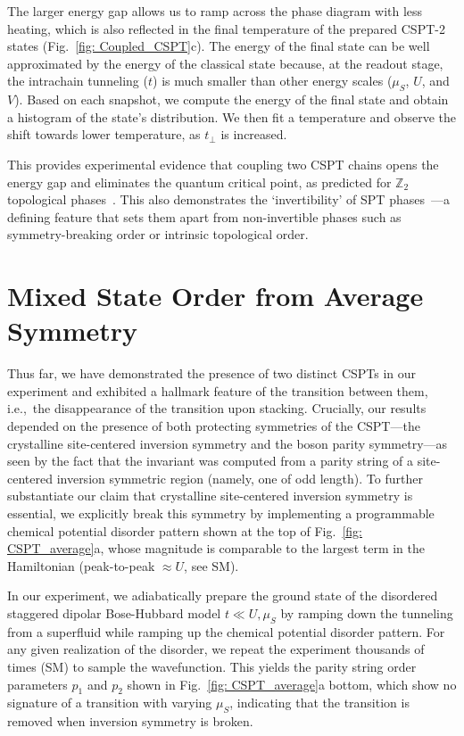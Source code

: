 \documentclass[preprint,superscriptaddress,floatfix, nofootinbib]{revtex4-2}
\begin{document}
The larger energy gap allows us to ramp across the phase diagram with less heating, which is also reflected in the final temperature of the prepared CSPT-2 states (Fig.~\ref{fig: Coupled_CSPT}c).
%
The energy of the final state can be well approximated by the energy of the classical state because, at the readout stage, the intrachain tunneling ($t$) is much smaller than other energy scales ($\mu_S$, $U$, and $V$). Based on each snapshot, we compute the energy of the final state and obtain a histogram of the state's distribution.
%
We then fit a temperature and observe the shift towards lower temperature, as $t_\perp$ is increased.

This provides experimental evidence that coupling two CSPT chains opens the energy gap and eliminates the quantum critical point, as predicted for $\mathbb{Z}_2$ topological phases~\cite{Gu2009}. This also demonstrates the `invertibility' of SPT phases~\cite{Freed2014}---a defining feature that sets them apart from non-invertible phases such as symmetry-breaking order or intrinsic topological order.

\section{Mixed State Order from Average Symmetry}

Thus far, we have demonstrated the presence of two distinct CSPTs in our experiment and exhibited a hallmark feature of the transition between them, i.e.,~the disappearance of the transition upon stacking.
%
Crucially, our results depended on the presence of both protecting symmetries of the CSPT---the crystalline site-centered inversion symmetry and the boson parity symmetry---as seen by the fact that the invariant was computed from a parity string of a site-centered inversion symmetric region (namely, one of odd length).
%
To further substantiate our claim that crystalline site-centered inversion symmetry is essential, we explicitly break this symmetry by implementing a programmable chemical potential disorder pattern shown at the top of Fig.~\ref{fig: CSPT_average}a, whose magnitude is comparable to the largest term in the Hamiltonian (peak-to-peak $\approx U$, see SM).

%
In our experiment, we adiabatically prepare the ground state of the disordered staggered dipolar Bose-Hubbard model $t \ll U, \mu_S$ by ramping down the tunneling from a superfluid while ramping up the chemical potential disorder pattern.
%
For any given realization of the disorder, we repeat the experiment thousands of times (SM) to sample the wavefunction.
%
This yields the parity string order parameters $p_1$ and $p_2$ shown in Fig.~\ref{fig: CSPT_average}a bottom, which show no signature of a transition with varying $\mu_S$, indicating that the transition is removed when inversion symmetry is broken.
%
\end{document}
